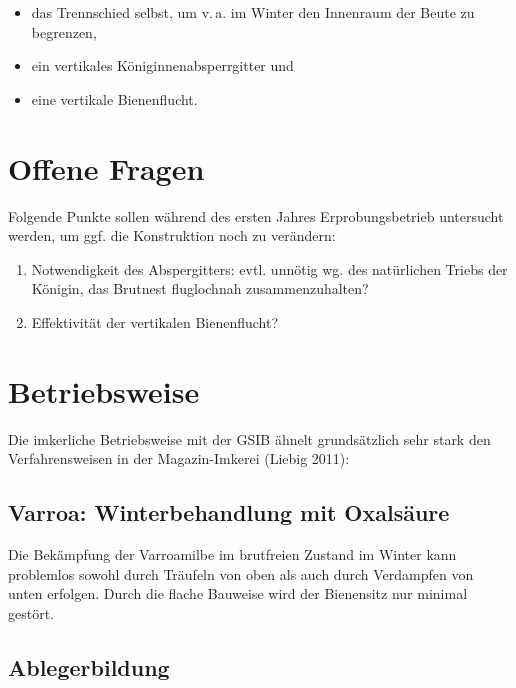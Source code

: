 \documentclass[12pt,a4paper,ngerman]{scrartcl}
\begin{document}
\begin{itemize}
\item das Trennschied selbst, um v.\,a. im Winter den Innenraum der Beute zu begrenzen,
\item ein vertikales Königinnenabsperrgitter und 
\item eine vertikale Bienenflucht.
\end{itemize}


\section{Offene Fragen}

Folgende Punkte sollen während des ersten Jahres Erprobungsbetrieb untersucht werden, um ggf. die Konstruktion noch zu verändern:

\begin{enumerate}
\item Notwendigkeit des Abspergitters: evtl. unnötig wg. des natürlichen Triebs der Königin, das Brutnest fluglochnah zusammenzuhalten?
\item Effektivität der vertikalen Bienenflucht?
\end{enumerate}


\section{Betriebsweise}

Die imkerliche Betriebsweise mit der GSIB ähnelt grundsätzlich sehr stark den Verfahrensweisen in der Magazin-Imkerei (Liebig 2011):


\subsection{Varroa: Winterbehandlung mit Oxalsäure}

Die Bekämpfung der Varroamilbe im brutfreien Zustand im Winter kann problemlos sowohl durch Träufeln von oben als auch durch Verdampfen von unten erfolgen.
Durch die flache Bauweise wird der Bienensitz nur minimal gestört.



\subsection{Ablegerbildung}
\end{document}
